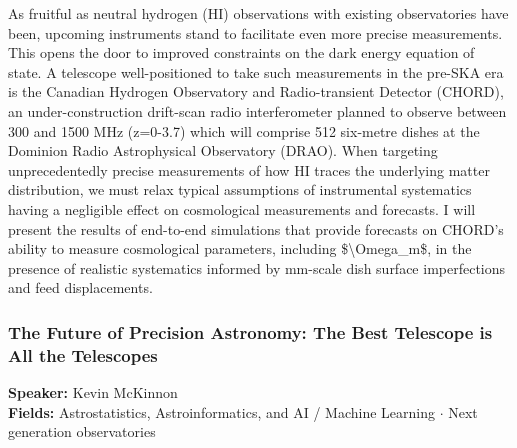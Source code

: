 As fruitful as neutral hydrogen (HI) observations with existing observatories have been, upcoming instruments stand to facilitate even more precise measurements. This opens the door to improved constraints on the dark energy equation of state. A telescope well-positioned to take such measurements in the pre-SKA era is the Canadian Hydrogen Observatory and Radio-transient Detector (CHORD), an under-construction drift-scan radio interferometer planned to observe between 300 and 1500 MHz (z=0-3.7) which will comprise 512 six-metre dishes at the Dominion Radio Astrophysical Observatory (DRAO). When targeting unprecedentedly precise measurements of how HI traces the underlying matter distribution, we must relax typical assumptions of instrumental systematics having a negligible effect on cosmological measurements and forecasts. I will present the results of end-to-end simulations that provide forecasts on CHORD's ability to measure cosmological parameters, including \$\textbackslash{}Omega\_m\$, in the presence of realistic systematics informed by mm-scale dish surface imperfections and feed displacements.

\hypertarget{abstract-talk-110}{}\label{abstract-page-talk-110}
\subsubsection*{The Future of Precision Astronomy: The Best Telescope is All the Telescopes}
\textbf{Speaker:} Kevin McKinnon\\
\textbf{Fields:} Astrostatistics, Astroinformatics, and AI / Machine Learning $\cdot$ Next generation observatories

